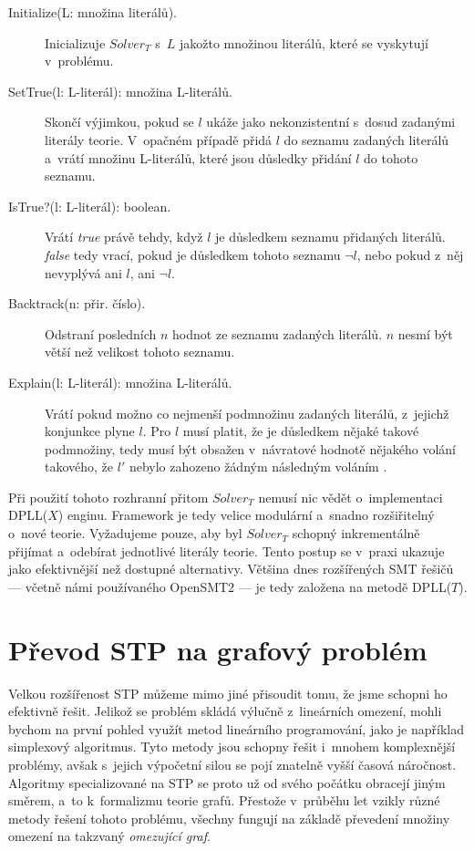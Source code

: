 \begin{description}
	\item[Initialize(L: množina literálů).] Inicializuje $Solver_T$ s~$L$ jakožto množinou literálů, které se vyskytují v~problému.
	\item[SetTrue(l: L-literál): množina L-literálů.] Skončí výjimkou, pokud se $l$ ukáže jako nekonzistentní s~dosud zadanými literály teorie. V~opačném případě přidá $l$ do seznamu zadaných literálů a~vrátí množinu L-literálů, které jsou důsledky přidání $l$ do tohoto seznamu.
	\item[IsTrue?(l: L-literál): boolean.] Vrátí \emph{true} právě tehdy, když $l$ je důsledkem seznamu přidaných literálů. \emph{false} tedy vrací, pokud je důsledkem tohoto seznamu $\neg l$, nebo pokud z~něj nevyplývá ani $l$, ani $\neg l$.
	\item[Backtrack(n: přir. číslo).] Odstraní posledních $n$ hodnot ze seznamu zadaných literálů. $n$ nesmí být větší než velikost tohoto seznamu.
	\item[Explain(l: L-literál): množina L-literálů.] Vrátí pokud možno co nejmenší podmnožinu zadaných literálů, z~jejichž konjunkce plyne $l$. Pro $l$ musí platit, že je důsledkem nějaké takové podmnožiny, tedy musí být obsažen v~návratové hodnotě nějakého volání  takového, že $l'$ nebylo zahozeno žádným následným voláním .
\end{description}

Při použití tohoto rozhranní přitom $Solver_T$ nemusí nic vědět o~implementaci DPLL($X$) enginu. Framework je tedy velice modulární a~snadno rozšiřitelný o~nové teorie. Vyžadujeme pouze, aby byl $Solver_T$ schopný inkrementálně přijímat a~odebírat jednotlivé literály teorie. Tento postup se v~praxi ukazuje jako efektivnější než dostupné alternativy. Většina dnes rozšířených SMT řešičů --- včetně námi používaného OpenSMT2 --- je tedy založena na metodě DPLL($T$).



\section{Převod STP na grafový problém}\label{graf}

Velkou rozšířenost STP můžeme mimo jiné přisoudit tomu, že jsme schopni ho efektivně řešit. Jelikož se problém skládá výlučně z~lineárních omezení, mohli bychom na první pohled využít metod lineárního programování, jako je například simplexový algoritmus. Tyto metody jsou schopny řešit i~mnohem komplexnější problémy, avšak s~jejich výpočetní silou se pojí znatelně vyšší časová náročnost. Algoritmy specializované na STP se proto už od svého počátku \cite[Kapitola 2]{Dechter91} obracejí jiným směrem, a~to k~formalizmu teorie grafů. Přestože v~průběhu let vzikly různé metody řešení tohoto problému, všechny fungují na základě převedení množiny omezení na takzvaný \emph{omezující graf}.

